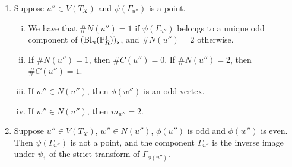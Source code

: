 \begin{lemma}\label{neigh} 
\begin{enumerate}[\upshape (a)] \hfill
\item Suppose $u'' \in V(T_X)$ and $\psi(\Gamma_{u''})$ is a point. 
 \begin{enumerate}[(i)]
 \item We have that $\# N(u'') = 1$ if $\psi(\Gamma_{u''})$ belongs to a unique odd component of $(\mathrm{Bl}_n(\P^1_R))_s$, and $\# N(u'') = 2$ otherwise. 
 \item If $\# N(u'') = 1$, then $\# C(u'') = 0$. If $\# N(u'') = 2$, then $\# C(u'') = 1$. 
 \item If $w'' \in N(u'')$, then $\phi(w'')$ is an odd vertex.
 \item If $w'' \in N(u'')$, then $m_{w''} = 2$. 
 \end{enumerate}
\item Suppose $u'' \in V(T_X)$, $w'' \in N(u'')$, $\phi(u'')$ is odd and $\phi(w'')$ is even. Then $\psi(\Gamma_{u''})$ is not a point, and the component $\Gamma_{u''}$ is the inverse image under $\psi_1$ of the strict transform of $\Gamma_{\phi(u'')}$.
\end{enumerate}
\end{lemma}
